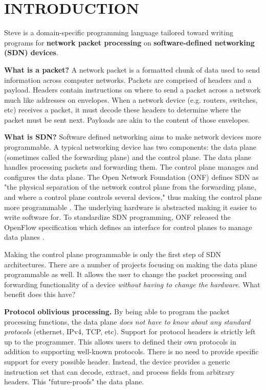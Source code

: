 \chapter{INTRODUCTION} \label{ch:intro}

Steve is a domain-specific programming language tailored toward writing programs for \textbf{network packet processing} on \textbf{software-defined networking (SDN) devices}. 

\textbf{What is a packet?} A network packet is a formatted chunk of data used to send information across computer networks. Packets are comprised of headers and a payload. Headers contain instructions on where to send a packet across a network much like addresses on envelopes. When a network device (e.g. routers, switches, etc) receives a packet, it must decode these headers to determine where the packet must be sent next. Payloads are akin to the content of those envelopes. 

\textbf{What is SDN?} Software defined networking aims to make network devices more programmable. A typical networking device has two components: the data plane (sometimes called the forwarding plane) and the control plane. The data plane handles processing packets and forwarding them. The control plane manages and configures the data plane. The Open Network Foundation (ONF) defines SDN as "the physical separation of the network control plane from the forwarding plane, and where a control plane controls several devices," thus making the control plane more programmable \cite{onf_sdn_def}. The underlying hardware is abstracted making it easier to write software for. To standardize SDN programming, ONF released the OpenFlow specification which defines an interface for control planes to manage data planes \cite{openflow_spec}.

Making the control plane programmable is only the first step of SDN architectures. There are a number of projects focusing on making the data plane programmable as well. It allows the user to change the packet processing and forwarding functionality of a device \textit{without having to change the hardware}. What benefit does this have?

\textbf{Protocol oblivious processing.} By being able to program the packet processing functions, the data plane \textit{does not have to know about any standard protocols} (ethernet, IPv4, TCP, etc). Support for protocol headers is strictly left up to the programmer. This allows users to defined their own protocols in addition to supporting well-known protocols. There is no need to provide specific support for every possible header. Instead, the device provides a generic instruction set that can decode, extract, and process fields from arbitrary headers. This "future-proofs" the data plane.

